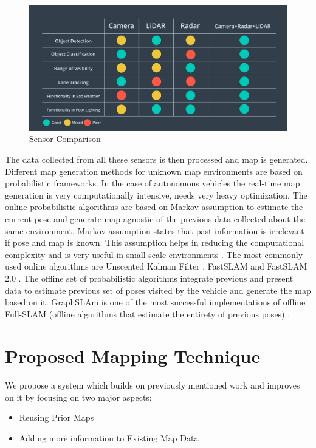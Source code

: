 \documentclass{article}
\begin{document}
			\begin{figure}[H]
				\includegraphics[width=\textwidth]{Sensor_Comparison}
				\caption{Sensor Comparison
				\cite{noauthor_self-driving_nodate}}
			\end{figure}
	
		
		The data collected from all these sensors is then processed and map is generated. 
		Different map generation methods for unknown map environments are based on probabilistic frameworks. In the case of autonomous vehicles the real-time map generation is very computationally intensive, needs very heavy optimization. The online probabilistic algorithms are based on Markov assumption to estimate the current pose and generate map agnostic of the previous data collected about the same environment.
		Markov assumption states that past information is irrelevant if pose and map is known.
		This assumption helps in reducing the computational complexity and is very useful in small-scale environments
		\cite{mutz_large-scale_2016}.
		The most commonly used online algorithms are Unscented Kalman Filter
		\cite{thrun_probabilistic_2005},
		FastSLAM
		\cite{montemerlo_fastslam:_2002}
		and FastSLAM 2.0
		\cite{montemerlo_fastslam:_2007}.
		The offline set of probabilistic algorithms integrate previous and present data to estimate previous set of poses visited by the vehicle and generate the map based on it. GraphSLAm is one of the most successful implementations of offline Full-SLAM (offline algorithms that estimate the entirety of previous poses)
		\cite{thrun_graph_2006}.
		
	\section{Proposed Mapping Technique}
		\paragraph{}
		We propose a system which builds on previously mentioned work and improves on it by focusing on two major aspects:
			\begin{itemize}
				\item Reusing Prior Maps
				\item Adding more information to Existing Map Data
			\end{itemize}
	
\end{document}
